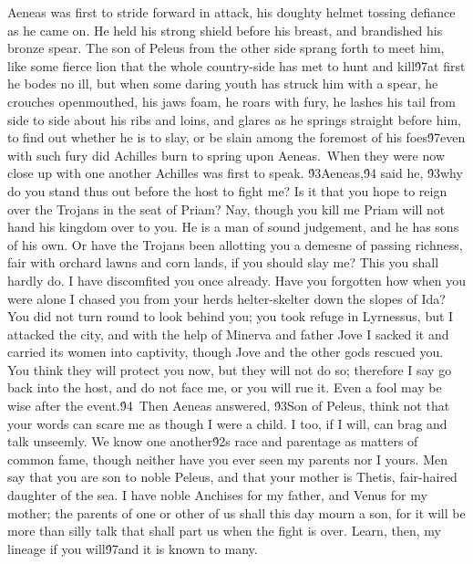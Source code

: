 {Aeneas was first to stride forward in attack, his doughty helmet tossing defiance as he came on. He held his strong shield before his breast, and brandished his bronze spear. The son of Peleus from the other side sprang forth to meet him, like some fierce lion that the whole country-side has met to hunt and kill\'97at first he bodes no ill, but when some daring youth has struck him with a spear, he crouches openmouthed, his jaws foam, he roars with fury, he lashes his tail from side to side about his ribs and loins, and glares as he springs straight before him, to find out whether he is to slay, or be slain among the foremost of his foes\'97even with such fury did Achilles burn to spring upon Aeneas.\
When they were now close up with one another Achilles was first to speak. \'93Aeneas,\'94 said he, \'93why do you stand thus out before the host to fight me? Is it that you hope to reign over the Trojans in the seat of Priam? Nay, though you kill me Priam will not hand his kingdom over to you. He is a man of sound judgement, and he has sons of his own. Or have the Trojans been allotting you a demesne of passing richness, fair with orchard lawns and corn lands, if you should slay me? This you shall hardly do. I have discomfited you once already. Have you forgotten how when you were alone I chased you from your herds helter-skelter down the slopes of Ida? You did not turn round to look behind you; you took refuge in Lyrnessus, but I attacked the city, and with the help of Minerva and father Jove I sacked it and carried its women into captivity, though Jove and the other gods rescued you. You think they will protect you now, but they will not do so; therefore I say go back into the host, and do not face me, or you will rue it. Even a fool may be wise after the event.\'94\
Then Aeneas answered, \'93Son of Peleus, think not that your words can scare me as though I were a child. I too, if I will, can brag and talk unseemly. We know one another\'92s race and parentage as matters of common fame, though neither have you ever seen my parents nor I yours. Men say that you are son to noble Peleus, and that your mother is Thetis, fair-haired daughter of the sea. I have noble Anchises for my father, and Venus for my mother; the parents of one or other of us shall this day mourn a son, for it will be more than silly talk that shall part us when the fight is over. Learn, then, my lineage if you will\'97and it is known to many.\
}
